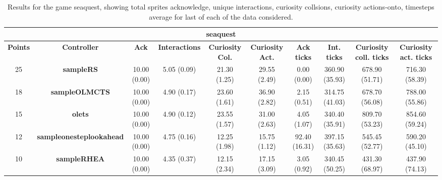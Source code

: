\begin{table*}[!t]
\begin{center}
\begin{adjustbox}{width=1\textwidth}
\begin{tabular}{|c|c|c|c|c|c|c|c|c|c|}
\multicolumn{10}{c}{\textbf{seaquest}}\\
\hline
\textbf{Points} & \textbf{Controller} & \textbf{Ack} & \textbf{Interactions} & \textbf{Curiosity Col.} & \textbf{Curiosity Act.} & \textbf{Ack ticks} & \textbf{Int. ticks} & \textbf{Curiosity coll. ticks} & \textbf{Curiosity act. ticks}\\
\hline
25 & \textbf{sampleRS} & 10.00 (0.00) & 5.05 (0.09) & 21.30 (1.25) & 29.55 (2.49) & 0.00 (0.00) & 360.90 (35.93) & 678.90 (51.71) & 716.30 (58.39)
 \\
\hline
18 & \textbf{sampleOLMCTS} & 10.00 (0.00) & 4.90 (0.17) & 23.60 (1.61) & 36.90 (2.82) & 2.15 (0.51) & 314.75 (41.03) & 678.70 (56.08) & 788.00 (55.86)
 \\
\hline
15 & \textbf{olets} & 10.00 (0.00) & 4.90 (0.12) & 23.55 (1.57) & 31.00 (2.63) & 4.05 (1.07) & 340.40 (35.91) & 809.70 (53.23) & 854.60 (59.24)
 \\
\hline
12 & \textbf{sampleonesteplookahead} & 10.00 (0.00) & 4.75 (0.16) & 12.25 (1.98) & 15.75 (1.12) & 92.40 (16.31) & 397.15 (35.63) & 545.45 (52.77) & 590.20 (45.10)
 \\
\hline
10 & \textbf{sampleRHEA} & 10.00 (0.00) & 4.35 (0.37) & 12.15 (2.34) & 17.15 (3.09) & 3.05 (0.92) & 340.45 (50.25) & 431.30 (68.97) & 437.90 (74.13)
 \\
\hline
\end{tabular}
\end{adjustbox}
\caption{Results for the game seaquest, showing total sprites acknowledge, unique interactions, curiosity collsions, curiosity actions-onto, timesteps average for last of each of the data considered.}
\label{tab:weights}
\end{center}
\end{table*}
